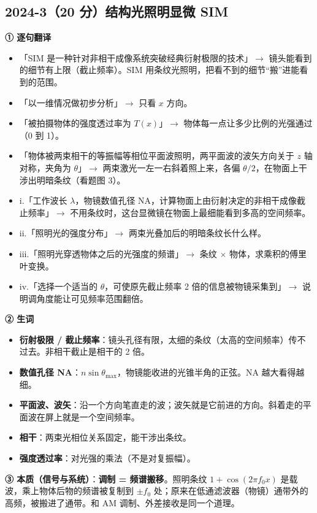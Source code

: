 \subsection{2024-3（20 分）结构光照明显微 SIM}\label{ex:2024-3}
\label{rd:2024-3}
\begin{idea}[读题：这道题在说什么]
\textbf{① 逐句翻译}
\begin{itemize}
\item 「SIM 是一种针对非相干成像系统突破经典衍射极限的技术」$\to$ 镜头能看到的细节有上限（截止频率）。SIM 用条纹光照明，把看不到的细节“搬”进能看到的范围。
\item 「以一维情况做初步分析」$\to$ 只看 $x$ 方向。
\item 「被拍摄物体的强度透过率为 $T(x)$」$\to$ 物体每一点让多少比例的光强通过（0 到 1）。
\item 「物体被两束相干的等振幅等相位平面波照明，两平面波的波矢方向关于 $z$ 轴对称，夹角为 $\theta$」$\to$ 两束激光一左一右斜着照上来，各偏 $\theta/2$，在物面上干涉出明暗条纹（看题图 3）。
\item i.「工作波长 $\lambda$，物镜数值孔径 NA，计算物面上由衍射决定的非相干成像截止频率」$\to$ 不用条纹时，这台显微镜在物面上最细能看到多高的空间频率。
\item ii.「照明光的强度分布」$\to$ 两束光叠加后的明暗条纹长什么样。
\item iii.「照明光穿透物体之后的光强度的频谱」$\to$ 条纹 $\times$ 物体，求乘积的傅里叶变换。
\item iv.「选择一个适当的 $\theta$，可使原先截止频率 2 倍的信息被物镜采集到」$\to$ 说明调角度能让可见频率范围翻倍。
\end{itemize}
\textbf{② 生词}
\begin{itemize}
\item \textbf{衍射极限 / 截止频率}：镜头孔径有限，太细的条纹（太高的空间频率）传不过去。非相干截止是相干的 2 倍。
\item \textbf{数值孔径 NA}：$n\sin\theta_{\max}$，物镜能收进的光锥半角的正弦。NA 越大看得越细。
\item \textbf{平面波、波矢}：沿一个方向笔直走的波；波矢就是它前进的方向。斜着走的平面波在屏上就是一个空间频率。
\item \textbf{相干}：两束光相位关系固定，能干涉出条纹。
\item \textbf{强度透过率}：对光强的乘法（不是对复振幅）。
\end{itemize}
\textbf{③ 本质（信号与系统）}：\textbf{调制 = 频谱搬移}。照明条纹 $1+\cos(2\pi f_0x)$ 是载波，乘上物体后物的频谱被复制到 $\pm f_0$ 处；原来在低通滤波器（物镜）通带外的高频，被搬进了通带。和 AM 调制、外差接收是同一个道理。


\end{idea}
